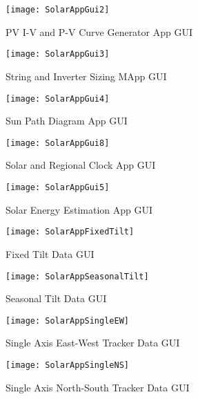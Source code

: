 
\begin{figure}[H]
\centering
\texttt{[image: SolarAppGui2]}
\caption{PV I-V and P-V Curve Generator App GUI}
\label{figApp1_2} %
\end{figure}

\begin{figure}[H]
\centering
\texttt{[image: SolarAppGui3]}
\caption{String and Inverter Sizing MApp GUI}
\label{figApp1_3} %
\end{figure}

\begin{figure}[H]
\centering
\texttt{[image: SolarAppGui4]}
\caption{Sun Path Diagram App GUI}
\label{figApp1_6} %
\end{figure}


\begin{figure}[H]
\centering
\texttt{[image: SolarAppGui8]}
\caption{Solar and Regional Clock App GUI}
\label{figApp1_4} %
\end{figure}

\begin{figure}[H]
\centering
\texttt{[image: SolarAppGui5]}
\caption{Solar Energy Estimation App GUI}
\label{figApp1_5} %
\end{figure}

\begin{figure}[H]
\centering
\texttt{[image: SolarAppFixedTilt]}
\caption{Fixed Tilt Data GUI}
\label{figApp1_6} %
\end{figure}

\begin{figure}[H]
\centering
\texttt{[image: SolarAppSeasonalTilt]}
\caption{Seasonal Tilt Data GUI}
\label{figApp1_7} %
\end{figure}

\begin{figure}[H]
\centering
\texttt{[image: SolarAppSingleEW]}
\caption{Single Axis East-West Tracker Data GUI}
\label{figApp1_8} %
\end{figure}

\begin{figure}[H]
\centering
\texttt{[image: SolarAppSingleNS]}
\caption{Single Axis North-South Tracker Data GUI}
\label{figApp1_9} %
\end{figure}

